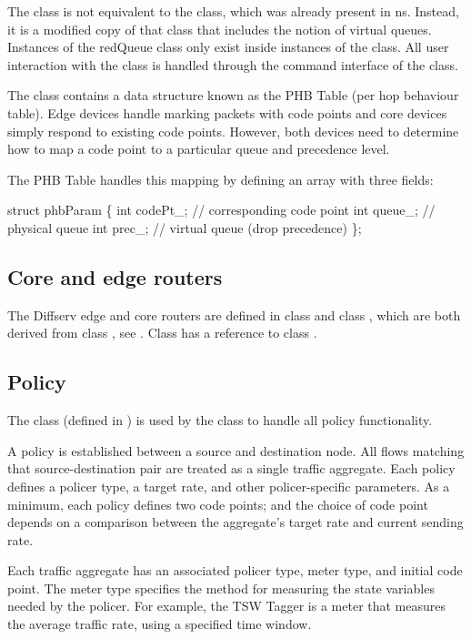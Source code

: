 The  class is not equivalent to the  class, which was already 
present in ns.  Instead, it is a modified copy of that class that includes the 
notion of virtual queues.
Instances of the redQueue class only exist inside instances of the  class.  All user interaction with the  class is handled through the command interface of the  class.

The  class contains a data structure known as the PHB Table 
(per hop behaviour table).  Edge devices handle marking packets with code points
 and core devices simply respond to existing code points.  However, both devices
 need to determine how to map a code point to a particular queue and precedence 
level.

The PHB Table handles this mapping by defining an array with three fields:

\begin{program}
struct phbParam \{
   int codePt_; // corresponding code point
   int queue_;	// physical queue
   int prec_;	// virtual queue (drop precedence)
\};
\end{program}


\subsection{Core and edge routers}
\label{sec:dsedge}
The Diffserv edge and core routers are defined in class  and 
class , which are both derived from class ,
see . Class  has a reference to
class .

\subsection{Policy}
\label{sec:dspolicy}
The class  (defined in ) is used by the 
class  to handle all policy functionality.

A policy is established between a source and destination node.  All flows 
matching that source-destination pair are treated as a single traffic aggregate.
Each policy defines a policer type, a target rate, and other policer-specific 
parameters.  As a minimum, each policy defines two code points; and the choice 
of code point depends on a comparison between the aggregate's target rate and 
current sending rate.

Each traffic aggregate has an associated policer type, meter type, and initial 
code point.  The meter type specifies the method for measuring the state 
variables needed by the policer.  For example, the TSW Tagger is a meter that 
measures the average traffic rate, using a specified time window.

